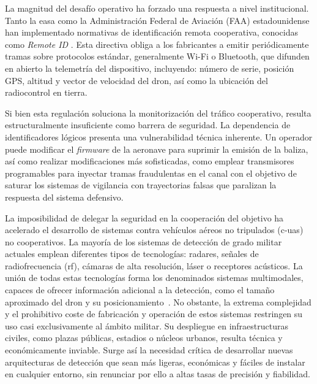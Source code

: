 La magnitud del desafío operativo ha forzado una respuesta a nivel institucional. Tanto la \gls{easa} como la Administración Federal de Aviación (FAA) estadounidense han implementado normativas de identificación remota cooperativa, conocidas como \textit{Remote ID} \cite{easa_remoteid_2021}. Esta directiva obliga a los fabricantes a emitir periódicamente tramas sobre protocolos estándar, generalmente Wi-Fi o Bluetooth, que difunden en abierto la telemetría del dispositivo, incluyendo: número de serie, posición GPS, altitud y vector de velocidad del dron, así como la ubicación del radiocontrol en tierra.

Si bien esta regulación soluciona la monitorización del tráfico cooperativo, resulta estructuralmente insuficiente como barrera de seguridad. La dependencia de identificadores lógicos presenta una vulnerabilidad técnica inherente. Un operador puede modificar el \textit{firmware} de la aeronave para suprimir la emisión de la baliza, así como realizar modificaciones más sofisticadas, como emplear transmisores programables para inyectar tramas fraudulentas en el canal con el objetivo de saturar los sistemas de vigilancia con trayectorias falsas que paralizan la respuesta del sistema defensivo.

La imposibilidad de delegar la seguridad en la cooperación del objetivo ha acelerado el desarrollo de sistemas contra vehículos aéreos no tripulados (\gls{c-uas}) no cooperativos. La mayoría de los sistemas de detección de grado militar actuales emplean diferentes tipos de tecnologías: radares, señales de radiofrecuencia (\gls{rf}), cámaras de alta resolución, láser o receptores acústicos. La unión de todas estas tecnologías forma los denominados sistemas multimodales, capaces de ofrecer información adicional a la detección, como el tamaño aproximado del dron y su posicionamiento~\cite{DEMACEDO2025100511, xu_radio_2025}. No obstante, la extrema complejidad y el prohibitivo coste de fabricación y operación de estos sistemas restringen su uso casi exclusivamente al ámbito militar. Su despliegue en infraestructuras civiles, como plazas públicas, estadios o núcleos urbanos, resulta técnica y económicamente inviable. Surge así la necesidad crítica de desarrollar nuevas arquitecturas de detección que sean más ligeras, económicas y fáciles de instalar en cualquier entorno, sin renunciar por ello a altas tasas de precisión y fiabilidad.

